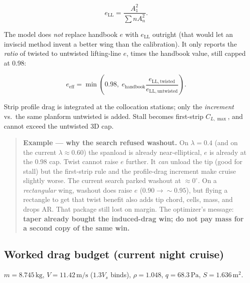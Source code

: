 \documentclass[11pt,letterpaper]{article}
\newenvironment{examplebox}{\begin{quote}\small}{\end{quote}}
\begin{document}
\begin{equation}
  e_\mathrm{LL} = \frac{A_1^2}{\sum n A_n^2}.
\end{equation}

The model does \emph{not} replace handbook $e$ with $e_\mathrm{LL}$ outright (that would let an inviscid method invent a better wing than the calibration). It only reports the \emph{ratio} of twisted to untwisted lifting-line $e$, times the handbook value, still capped at 0.98:

\begin{equation}
  e_\mathrm{eff} = \min\left(0.98,\;
    e_\mathrm{handbook} \frac{e_\mathrm{LL,twisted}}{e_\mathrm{LL,untwisted}}\right).
\end{equation}

Strip profile drag is integrated at the collocation stations; only the \emph{increment} vs.\ the same planform untwisted is added. Stall becomes first-strip $C_{L,\max}$, and cannot exceed the untwisted 3D cap.

\begin{examplebox}
\textbf{Example --- why the search refused washout.}
On $\lambda = 0.4$ (and on the current $\lambda \approx 0.60$) the spanload is already near-elliptical, $e$ is already at the 0.98 cap. Twist cannot raise $e$ further. It \emph{can} unload the tip (good for stall) but the first-strip rule and the profile-drag increment make cruise slightly worse. The current search parked washout at $\approx 0^\circ$. On a \emph{rectangular} wing, washout does raise $e$ ($0.90 \to \sim 0.95$), but flying a rectangle to get that twist benefit also adds tip chord, cells, mass, and drops AR. That package still lost on margin. The optimizer's message: \textbf{taper already bought the induced-drag win; do not pay mass for a second copy of the same win.}
\end{examplebox}

\subsection{Worked drag budget (current night cruise)}
\label{sec:dragbudget}

$m = 8.745\,\mathrm{kg}$, $V = 11.42\,\mathrm{m/s}$ ($1.3 V_s$ binds), $\rho = 1.048$, $q = 68.3\,\mathrm{Pa}$, $S = 1.636\,\mathrm{m^2}$.
\end{document}
